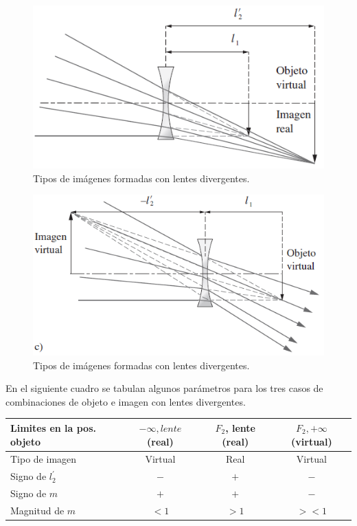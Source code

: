 \documentclass[14pt]{extarticle}
\begin{document}
\begin{figure}[H]
    \centering
    \includegraphics[scale=0.8]{Imagenes/Lentes_09b.png}
    \caption{Tipos de imágenes formadas con lentes divergentes.}
    \label{fig:figura_II_08b}
\end{figure}
\begin{figure}[H]
    \centering
    \includegraphics[scale=0.8]{Imagenes/Lentes_09c.png}
    \caption{Tipos de imágenes formadas con lentes divergentes.}
    \label{fig:figura_II_08c}
\end{figure}
En el siguiente cuadro se tabulan algunos parámetros para los tres casos de combinaciones de objeto e imagen con lentes divergentes.
\begin{table}[H]
    \centering
    \begin{tabular}{l c c c}
        Limites en la pos. objeto & $-\infty, lente$ (real) & $F_{2}$, lente (real) & $F_{2}, +\infty$ (virtual) \\ \hline
        Tipo de imagen & Virtual & Real & Virtual \\
        Signo de $l_{2}^{\prime}$ & $-$ & $+$ & $-$ \\
        Signo de $m$ & $+$ & $+$ & $-$ \\
        Magnitud de $m$ & $< 1$ & $> 1$ & $>< 1$        
    \end{tabular}
\end{table}
\end{document}
